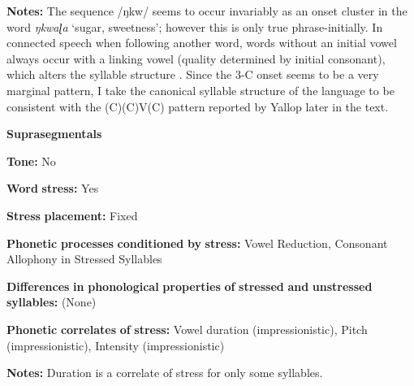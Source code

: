 \documentclass[output=paper]{langsci/langscibook}
\begin{document}
\begin{styleBody}
\textbf{Notes:} The sequence /ŋkw/ seems to occur invariably as an onset cluster in the word \textit{ŋkwaɭa} ‘sugar, sweetness’; however this is only true phrase-initially. In connected speech when following another word, words without an initial vowel always occur with a linking vowel (quality determined by initial consonant), which alters the syllable structure \citep[28-30]{Yallop1977}. Since the 3-C onset seems to be a very marginal pattern, I take the canonical syllable structure of the language to be consistent with the (C)(C)V(C) pattern reported by Yallop later in the text.
\end{styleBody}

\begin{styleBody}
\textbf{Suprasegmentals}
\end{styleBody}

\begin{styleBody}
\textbf{Tone:} No
\end{styleBody}

\begin{styleBody}
\textbf{Word} \textbf{stress:} Yes
\end{styleBody}

\begin{styleBody}
\textbf{Stress} \textbf{placement:} Fixed
\end{styleBody}

\begin{styleBody}
\textbf{Phonetic} \textbf{processes} \textbf{conditioned} \textbf{by} \textbf{stress:} Vowel Reduction, Consonant Allophony in Stressed Syllables
\end{styleBody}

\begin{styleBody}
\textbf{Differences} \textbf{in} \textbf{phonological} \textbf{properties} \textbf{of} \textbf{stressed} \textbf{and} \textbf{unstressed} \textbf{syllables:} (None)
\end{styleBody}

\begin{styleBody}
\textbf{Phonetic} \textbf{correlates} \textbf{of} \textbf{stress:} Vowel duration (impressionistic), Pitch (impressionistic), Intensity (impressionistic)
\end{styleBody}

\begin{styleBody}
\textbf{Notes:} Duration is a correlate of stress for only some syllables.
\end{styleBody}
\end{document}
